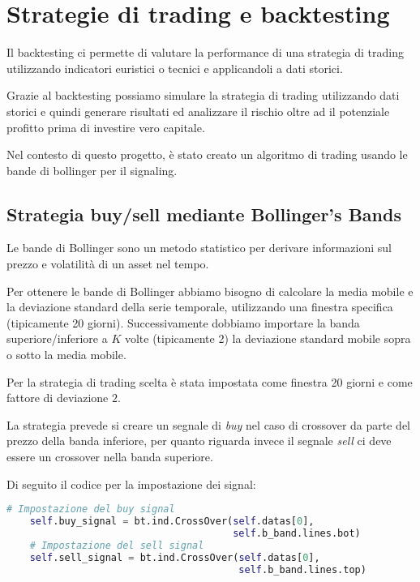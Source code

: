 
\section{Strategie di trading e backtesting}

Il backtesting ci permette di valutare la performance di una strategia di trading utilizzando
indicatori euristici o tecnici e applicandoli a dati storici.

Grazie al backtesting possiamo simulare la strategia di trading utilizzando dati storici e quindi generare risultati
ed analizzare il rischio oltre ad il potenziale profitto prima di investire vero capitale.

Nel contesto di questo progetto, è stato creato un algoritmo di trading usando le bande di bollinger per il signaling.

\subsection{Strategia buy/sell mediante Bollinger's Bands}

Le bande di Bollinger sono un metodo statistico per derivare informazioni sul prezzo e volatilità di un asset
nel tempo.

Per ottenere le bande di Bollinger abbiamo bisogno di calcolare la media mobile e la deviazione standard della serie
temporale, utilizzando una finestra specifica (tipicamente 20 giorni). Successivamente dobbiamo importare la banda
superiore/inferiore a $K$ volte (tipicamente 2) la deviazione standard mobile sopra o sotto la media mobile.

Per la strategia di trading scelta è stata impostata come finestra 20 giorni e come fattore di deviazione $2$.

La strategia prevede si creare un segnale di \emph{buy} nel caso di crossover da parte del prezzo della banda inferiore,
per quanto riguarda invece il segnale \emph{sell} ci deve essere un crossover nella banda superiore.

Di seguito il codice per la impostazione dei signal:

\begin{lstlisting}[language=Python]
    # Impostazione del buy signal
    self.buy_signal = bt.ind.CrossOver(self.datas[0],
                                       self.b_band.lines.bot)
    # Impostazione del sell signal
    self.sell_signal = bt.ind.CrossOver(self.datas[0],
                                        self.b_band.lines.top)
\end{lstlisting}

